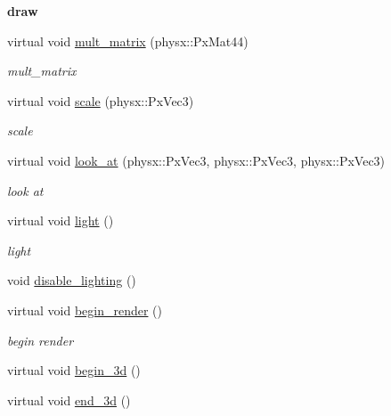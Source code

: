 \begin{Indent}{\bf draw}
\begin{DoxyCompactItemize}
virtual void \hyperlink{classnebula_1_1platform_1_1renderer_1_1gl_1_1base_a31fd2eab976e8d85e0d9ddcf9435b4e8}{mult\_\-matrix} (physx::PxMat44)
\begin{DoxyCompactList}\small\item\em mult\_\-matrix \item\end{DoxyCompactList}\item 
virtual void \hyperlink{classnebula_1_1platform_1_1renderer_1_1gl_1_1base_aa2cb1371b6b66b24b1d9bc8b8bbe1f90}{scale} (physx::PxVec3)
\begin{DoxyCompactList}\small\item\em scale \item\end{DoxyCompactList}\item 
virtual void \hyperlink{classnebula_1_1platform_1_1renderer_1_1gl_1_1base_a9409d2f85fd5b8ceb9aa159f557a77c4}{look\_\-at} (physx::PxVec3, physx::PxVec3, physx::PxVec3)
\begin{DoxyCompactList}\small\item\em look at \item\end{DoxyCompactList}\item 
virtual void \hyperlink{classnebula_1_1platform_1_1renderer_1_1gl_1_1base_a05d47dc08e518dca1f1f6940dd25b1d4}{light} ()
\begin{DoxyCompactList}\small\item\em light \item\end{DoxyCompactList}\item 
void \hyperlink{classnebula_1_1platform_1_1renderer_1_1gl_1_1base_a157b9626fd03370a47898b1c0f7bbe2e}{disable\_\-lighting} ()
\item 
virtual void \hyperlink{classnebula_1_1platform_1_1renderer_1_1gl_1_1base_a992eba193eb6f08eea3f22363ff5ee18}{begin\_\-render} ()
\begin{DoxyCompactList}\small\item\em begin render \item\end{DoxyCompactList}\item 
virtual void \hyperlink{classnebula_1_1platform_1_1renderer_1_1gl_1_1base_aade6306589ca7fea773433e8f2ac2e52}{begin\_\-3d} ()
\item 
virtual void \hyperlink{classnebula_1_1platform_1_1renderer_1_1gl_1_1base_a6433b19464dae4b08fcfd20ca1ca8731}{end\_\-3d} ()
\item 

\end{DoxyCompactItemize}
\end{Indent}
